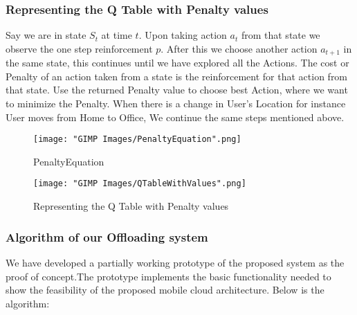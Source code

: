 \documentclass{report}
\begin{document}
\subsubsection{Representing the Q Table with Penalty values}
Say we are in state $ S_t $ at time $t$. Upon taking action $ a_t $ from that state we observe the one step reinforcement $p$.
After this we choose another action $a_{t+1}$ in the same state, this continues until we have explored all the Actions. The cost or Penalty of an action taken from a state is the reinforcement for that action from that state. Use the returned Penalty value to choose best Action, where we want to minimize the Penalty. When there is a change in User's Location for instance User moves from Home to Office, We continue the same steps mentioned above.

\begin{figure}[h]
  \centering
  \texttt{[image: "GIMP Images/PenaltyEquation".png]}
  \caption{PenaltyEquation}
  \label{fig:PenaltyEquation}
\end{figure}

\begin{figure}[h]
  \centering
  \texttt{[image: "GIMP Images/QTableWithValues".png]}
  \caption{Representing the Q Table with Penalty values}
  \label{fig:QTableWithValues}
\end{figure}




\subsubsection{Algorithm of our Offloading system}
We have developed a partially working prototype of the proposed system as the proof of concept.The prototype implements the basic functionality needed to show the feasibility of the proposed mobile cloud architecture. Below is the algorithm:
\end{document}
